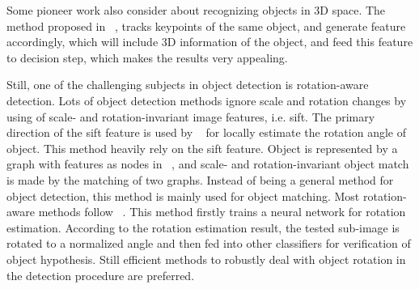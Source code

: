Some pioneer work also consider about recognizing objects in 3D space. The method proposed in ~\cite{r3d}, tracks keypoints of the same object, and generate feature accordingly, which will include 3D information of the object, and feed this feature to decision step, which makes the results very appealing.



Still, one of the challenging subjects in object detection is rotation-aware detection. Lots of object detection methods ignore scale and rotation changes by using of scale- and rotation-invariant image features, i.e. sift.
The primary  direction of the sift feature is used by ~\cite{ac21} for locally estimate the rotation angle of object. This method heavily rely on the sift feature.
Object is represented by a graph with features as nodes in ~\cite{ac222}, and scale- and rotation-invariant object match is made by the matching of two graphs. Instead of being a general method for object detection, this method is mainly used for object matching.
Most rotation-aware methods follow ~\cite{ac20}. This method firstly trains a neural network for rotation estimation. According to the rotation estimation result, the tested sub-image is rotated to a normalized angle and then fed into other classifiers for verification of object hypothesis. Still efficient methods to robustly deal with object rotation in the detection procedure are preferred.




\begin{comment}
(a) a well-de?ned closed boundary
in space; (b) a different appearance from their surroundings [23, 25]; (c) sometimes it is unique within the image
and stands out as salient
\end{comment}


